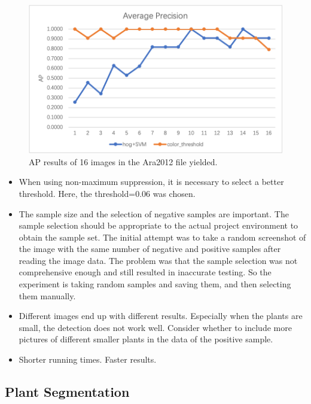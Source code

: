 \documentclass[conference]{IEEEtran}
\begin{document}
\begin{figure}[htbp]
\centerline{\includegraphics[scale=0.59]{P1.png}}
\caption{AP results of 16 images in the Ara2012 file yielded.}
\label{fig1}
\end{figure}






\begin{itemize}
\item When using non-maximum suppression, it is necessary to select a better threshold. Here, the threshold=0.06 was chosen.
\item The sample size and the selection of negative samples are important. The sample selection should be appropriate to the actual project environment to obtain the sample set. The initial attempt was to take a random screenshot of the image with the same number of negative and positive samples after reading the image data. The problem was that the sample selection was not comprehensive enough and still resulted in inaccurate testing. So the experiment is taking random samples and saving them, and then selecting them manually.
\item Different images end up with different results.  Especially when the plants are small, the detection does not work well. Consider whether to include more pictures of different smaller plants in the data of the positive sample.
\item Shorter running times. Faster results.
\end{itemize}

\subsection{Plant Segmentation}
\end{document}

